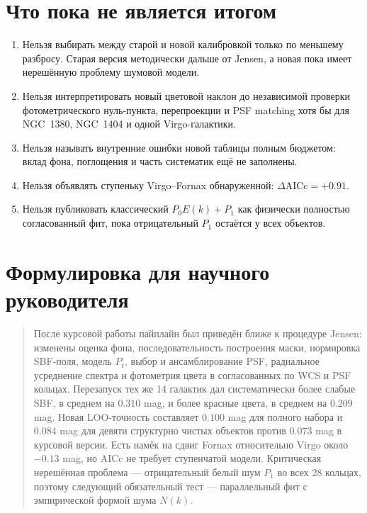 \documentclass[12pt,a4paper]{article}
\begin{document}
\section{Что пока не является итогом}

\begin{enumerate}
    \item Нельзя выбирать между старой и новой калибровкой
    только по меньшему разбросу. Старая версия методически
    дальше от Jensen, а новая пока имеет нерешённую проблему
    шумовой модели.
    \item Нельзя интерпретировать новый цветовой наклон до
    независимой проверки фотометрического нуль-пункта,
    перепроекции и PSF matching хотя бы для NGC~1380,
    NGC~1404 и одной Virgo-галактики.
    \item Нельзя называть внутренние ошибки новой таблицы
    полным бюджетом: вклад фона, поглощения и часть
    систематик ещё не заполнены.
    \item Нельзя объявлять ступеньку Virgo--Fornax
    обнаруженной: \(\Delta\mathrm{AICc}=+0.91\).
    \item Нельзя публиковать классический \(P_0E(k)+P_1\)
    как физически полностью согласованный фит, пока
    отрицательный \(P_1\) остаётся у всех объектов.
\end{enumerate}

\section{Формулировка для научного руководителя}

\begin{quote}
После курсовой работы пайплайн был приведён ближе к процедуре
Jensen: изменены оценка фона, последовательность построения
маски, нормировка SBF-поля, модель \(P_{\mathrm r}\), выбор и
ансамблирование PSF, радиальное усреднение спектра и
фотометрия цвета в согласованных по WCS и PSF кольцах.
Перезапуск тех же 14 галактик дал систематически более слабые
SBF, в среднем на \(0.310\) mag, и более красные цвета, в
среднем на \(0.209\) mag. Новая LOO-точность составляет
\(0.100\) mag для полного набора и \(0.084\) mag для девяти
структурно чистых объектов против \(0.073\) mag в курсовой
версии. Есть намёк на сдвиг Fornax относительно Virgo около
\(-0.13\) mag, но AICc не требует ступенчатой модели.
Критическая нерешённая проблема --- отрицательный белый
шум \(P_1\) во всех 28 кольцах, поэтому следующий
обязательный тест --- параллельный фит с эмпирической формой
шума \(N(k)\).
\end{quote}
\end{document}

